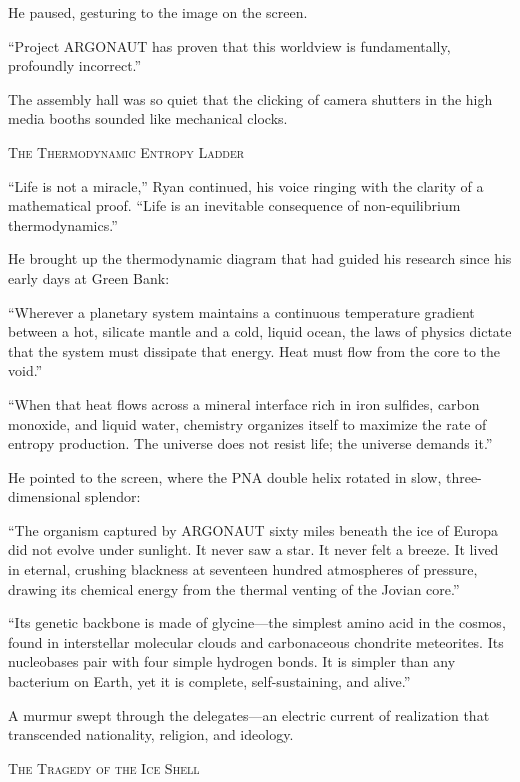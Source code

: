 \documentclass[12pt,twoside,openright]{book}
\newcommand{\sceneheader}[1]{%
  \par\vspace{1.8em}%
  {\noindent\centering\scshape\large #1\par}%
  \vspace{1.0em}%
  \noindent%
}
\newcommand{\dinkus}{%
  \par\vspace{1.2em}%
  {\noindent\centering{\large $\ast\quad\ast\quad\ast$}\par}%
  \vspace{1.2em}%
  \noindent%
}
\begin{document}
He paused, gesturing to the image on the screen.

``Project ARGONAUT has proven that this worldview is fundamentally,
profoundly incorrect.''

The assembly hall was so quiet that the clicking of camera shutters in
the high media booths sounded like mechanical clocks.

\dinkus

\sceneheader{The Thermodynamic Entropy
Ladder}

``Life is not a miracle,'' Ryan continued, his voice ringing with the
clarity of a mathematical proof. ``Life is an inevitable consequence of
non-equilibrium thermodynamics.''

He brought up the thermodynamic diagram that had guided his research
since his early days at Green Bank:

``Wherever a planetary system maintains a continuous temperature
gradient between a hot, silicate mantle and a cold, liquid ocean, the
laws of physics dictate that the system must dissipate that energy. Heat
must flow from the core to the void.''

``When that heat flows across a mineral interface rich in iron sulfides,
carbon monoxide, and liquid water, chemistry organizes itself to
maximize the rate of entropy production. The universe does not resist
life; the universe demands it.''

He pointed to the screen, where the PNA double helix rotated in slow,
three-dimensional splendor:

``The organism captured by ARGONAUT sixty miles beneath the ice of
Europa did not evolve under sunlight. It never saw a star. It never felt
a breeze. It lived in eternal, crushing blackness at seventeen hundred
atmospheres of pressure, drawing its chemical energy from the thermal
venting of the Jovian core.''

``Its genetic backbone is made of glycine---the simplest amino acid in
the cosmos, found in interstellar molecular clouds and carbonaceous
chondrite meteorites. Its nucleobases pair with four simple hydrogen
bonds. It is simpler than any bacterium on Earth, yet it is complete,
self-sustaining, and alive.''

A murmur swept through the delegates---an electric current of
realization that transcended nationality, religion, and ideology.

\dinkus

\sceneheader{The Tragedy of the Ice
Shell}
\end{document}
